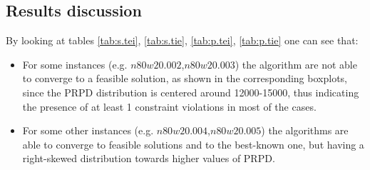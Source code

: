\begin{homeworkProblem}

\subsection{Results discussion}
By looking at tables \ref{tab:s.tei}, \ref{tab:s.tie}, \ref{tab:p.tei}, \ref{tab:p.tie} one can see that:
\begin{itemize}

\item For some instances (e.g. $n80w20.002$,$n80w20.003$) the algorithm are not able to converge to a feasible solution, as shown in the corresponding boxplots, since the PRPD distribution is centered around 12000-15000, thus indicating the presence of at least 1 constraint violations in most of the cases.

\item For some other instances (e.g. $n80w20.004$,$n80w20.005$) the algorithms are able to converge to feasible solutions and to the best-known one, but having a right-skewed distribution towards higher values of PRPD.


\end{itemize}
\end{homeworkProblem}
